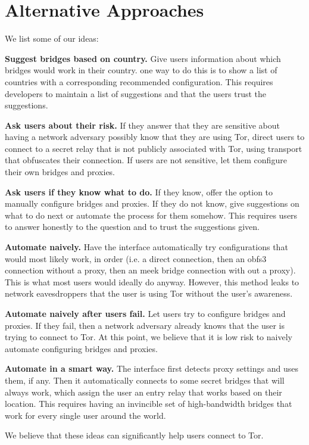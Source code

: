 \documentclass[USenglish,oneside,twocolumn]{article}
\begin{document}
\section{Alternative Approaches} 
\label{alternatives}
We list some of our ideas:\\
\begin{description}
\item{\bfseries Suggest bridges based on country.} Give users information about which bridges would work in their country. one way to do this is to show a list of countries with a corresponding recommended configuration. This requires developers to maintain a list of suggestions and that the users trust the suggestions. 
\item{\bfseries Ask users about their risk.} If they answer that they are sensitive about having a network adversary possibly know that they are using Tor, direct users to connect to a secret relay that is not publicly associated with Tor, using transport that obfuscates their connection. If users are not sensitive, let them configure their own bridges and proxies. 
\item{\bfseries Ask users if they know what to do.} If they know, offer the option to manually configure bridges and proxies. If they do not know, give suggestions on what to do next or automate the process for them somehow. This requires users to answer honestly to the question and to trust the suggestions given. 
\item{\bfseries Automate naively.} Have the interface automatically try configurations that would most likely work, in order (i.e. a direct connection, then an obfs3 connection without a proxy, then an meek bridge connection with out a proxy). This is what most users would ideally do anyway. However, this method leaks to network eavesdroppers that the user is using Tor without the user's awareness. 
\item {\bfseries Automate naively after users fail.} Let users try to configure bridges and proxies. If they fail, then a network adversary already knows that the user is trying to connect to Tor. At this point, we believe that it is low risk to naively automate configuring bridges and proxies. 
\item{\bfseries Automate in a smart way.} The interface first detects proxy settings and uses them, if any. Then it automatically connects to some secret bridges that will always work, which assign the user an entry relay that works based on their location. This requires having an invincible set of high-bandwidth bridges that work for every single user around the world.  
\end{description}

We believe that these ideas can significantly help users connect to Tor. 
\end{document}
